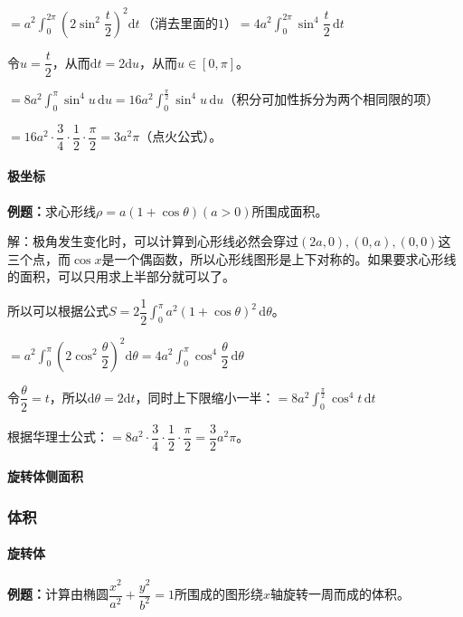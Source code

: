 \documentclass[UTF8, 12pt]{ctexart}
\begin{document}
$=a^2\displaystyle{\int_0^{2\pi}\left(2\sin^2\dfrac{t}{2}\right)^2\textrm{d}t}\,\text{（消去里面的1）}=4a^2\displaystyle{\int_0^{2\pi}\sin^4\dfrac{t}{2}\,\textrm{d}t}$

令$u=\dfrac{t}{2}$，从而$\textrm{d}t=2\textrm{d}u$，从而$u\in[0,\pi]$。

$=8a^2\int_0^\pi\sin^4u\,\textrm{d}u=16a^2\int_0^{\frac{\pi}{2}}\sin^4u\,\textrm{d}u$（积分可加性拆分为两个相同限的项）

$=16a^2\cdot\dfrac{3}{4}\cdot\dfrac{1}{2}\cdot\dfrac{\pi}{2}=3a^2\pi$（点火公式）。

\paragraph{极坐标} \leavevmode \medskip

\textbf{例题：}求心形线$\rho=a(1+\cos\theta)(a>0)$所围成面积。

解：极角发生变化时，可以计算到心形线必然会穿过$(2a,0),(0,a),(0,0)$这三个点，而$\cos x$是一个偶函数，所以心形线图形是上下对称的。如果要求心形线的面积，可以只用求上半部分就可以了。

所以可以根据公式$S=2\dfrac{1}{2}\int_0^\pi a^2(1+\cos\theta)^2\,\textrm{d}\theta$。

$=a^2\displaystyle{\int_0^\pi\left(2\cos^2\dfrac{\theta}{2}\right)^2\textrm{d}\theta}=4a^2\displaystyle{\int_0^\pi\cos^4\dfrac{\theta}{2}\,\textrm{d}\theta}$

令$\dfrac{\theta}{2}=t$，所以$\textrm{d}\theta=2\textrm{d}t$，同时上下限缩小一半：$=8a^2\int_0^{\frac{\pi}{2}}\cos^4t\,\textrm{d}t$

根据华理士公式：$=8a^2\cdot\dfrac{3}{4}\cdot\dfrac{1}{2}\cdot\dfrac{\pi}{2}=\dfrac{3}{2}a^2\pi$。

\paragraph{旋转体侧面积} \leavevmode \medskip

\subsubsection{体积}

\paragraph{旋转体} \leavevmode \medskip

\textbf{例题：}计算由椭圆$\dfrac{x^2}{a^2}+\dfrac{y^2}{b^2}=1$所围成的图形绕$x$轴旋转一周而成的体积。
\end{document}
